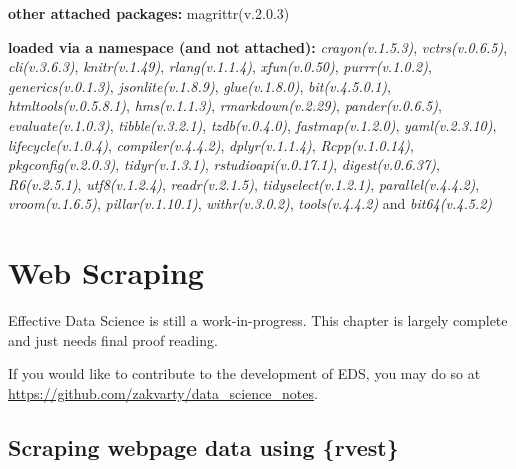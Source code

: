 \documentclass[
  letterpaper,
  DIV=11,
  numbers=noendperiod]{scrreprt}
\begin{document}
\textbf{other attached packages:} magrittr(v.2.0.3)

\textbf{loaded via a namespace (and not attached):}
\emph{crayon(v.1.5.3)}, \emph{vctrs(v.0.6.5)}, \emph{cli(v.3.6.3)},
\emph{knitr(v.1.49)}, \emph{rlang(v.1.1.4)}, \emph{xfun(v.0.50)},
\emph{purrr(v.1.0.2)}, \emph{generics(v.0.1.3)},
\emph{jsonlite(v.1.8.9)}, \emph{glue(v.1.8.0)}, \emph{bit(v.4.5.0.1)},
\emph{htmltools(v.0.5.8.1)}, \emph{hms(v.1.1.3)},
\emph{rmarkdown(v.2.29)}, \emph{pander(v.0.6.5)},
\emph{evaluate(v.1.0.3)}, \emph{tibble(v.3.2.1)}, \emph{tzdb(v.0.4.0)},
\emph{fastmap(v.1.2.0)}, \emph{yaml(v.2.3.10)},
\emph{lifecycle(v.1.0.4)}, \emph{compiler(v.4.4.2)},
\emph{dplyr(v.1.1.4)}, \emph{Rcpp(v.1.0.14)}, \emph{pkgconfig(v.2.0.3)},
\emph{tidyr(v.1.3.1)}, \emph{rstudioapi(v.0.17.1)},
\emph{digest(v.0.6.37)}, \emph{R6(v.2.5.1)}, \emph{utf8(v.1.2.4)},
\emph{readr(v.2.1.5)}, \emph{tidyselect(v.1.2.1)},
\emph{parallel(v.4.4.2)}, \emph{vroom(v.1.6.5)},
\emph{pillar(v.1.10.1)}, \emph{withr(v.3.0.2)}, \emph{tools(v.4.4.2)}
and \emph{bit64(v.4.5.2)}

\chapter{Web Scraping}\label{data-webscraping}

\begin{tcolorbox}[enhanced jigsaw, leftrule=.75mm, bottomtitle=1mm, toprule=.15mm, colbacktitle=quarto-callout-note-color!10!white, breakable, colback=white, bottomrule=.15mm, opacityback=0, colframe=quarto-callout-note-color-frame, title=\textcolor{quarto-callout-note-color}{\faInfo}\hspace{0.5em}{Note}, titlerule=0mm, toptitle=1mm, opacitybacktitle=0.6, arc=.35mm, rightrule=.15mm, coltitle=black, left=2mm]

Effective Data Science is still a work-in-progress. This chapter is
largely complete and just needs final proof reading.

If you would like to contribute to the development of EDS, you may do so
at \url{https://github.com/zakvarty/data_science_notes}.

\end{tcolorbox}

\section{Scraping webpage data using
\{rvest\}}\label{scraping-webpage-data-using-rvest}
\end{document}
